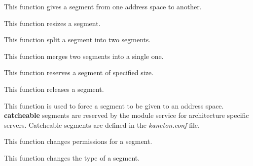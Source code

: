 	  {This function gives a segment from one address space to another.}

	  {This function resizes a segment.}

	  {This function split a segment into two segments.}

	  {This function merges two segments into a single one.}

	  {This function reserves a segment of specified size.}

	  {This function releases a segment.}

	  {This function is used to force a segment to be given to an address
	    space. \textbf{catcheable} segments are reserved by the module
	    service for architecture specific servers. Catcheable segments
	    are defined in the \textit{kaneton.conf} file.}

	  {This function changes permissions for a segment.}

	  {This function changes the type of a segment.}

